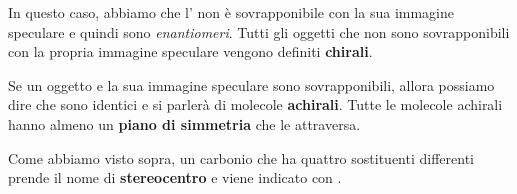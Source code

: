 In questo caso, abbiamo che l' non è sovrapponibile con la sua immagine speculare e quindi sono \textit{enantiomeri}. Tutti gli oggetti che non sono sovrapponibili con la propria immagine speculare vengono definiti \textbf{chirali}.

Se un oggetto e la sua immagine speculare sono sovrapponibili, allora possiamo dire che sono identici e si parlerà di molecole \textbf{achirali}. Tutte le molecole achirali hanno almeno un \textbf{piano di simmetria} che le attraversa.

Come abbiamo visto sopra, un carbonio che ha quattro sostituenti differenti prende il nome di \textbf{stereocentro} e viene indicato con .

